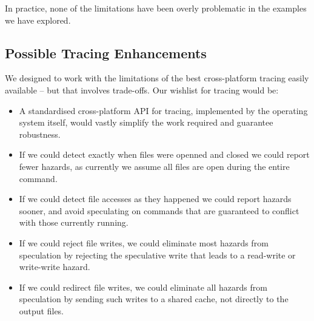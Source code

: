 \noindent In practice, none of the limitations have been overly problematic in the examples we have explored.

\subsection{Possible Tracing Enhancements}

We designed \Rattle to work with the limitations of the best cross-platform tracing easily available -- but that involves trade-offs. Our wishlist for tracing would be:

\begin{itemize}
\item A standardised cross-platform API for tracing, implemented by the operating system itself, would vastly simplify the work required and guarantee robustness.
\item If we could detect exactly when files were openned and closed we could report fewer hazards, as currently we assume all files are open during the entire command.
\item If we could detect file accesses as they happened we could report hazards sooner, and avoid speculating on commands that are guaranteed to conflict with those currently running.
\item If we could reject file writes, we could eliminate most hazards from speculation by rejecting the speculative write that leads to a read-write or write-write hazard.
\item If we could redirect file writes, we could eliminate all hazards from speculation by sending such writes to a shared cache, not directly to the output files.
\end{itemize}
